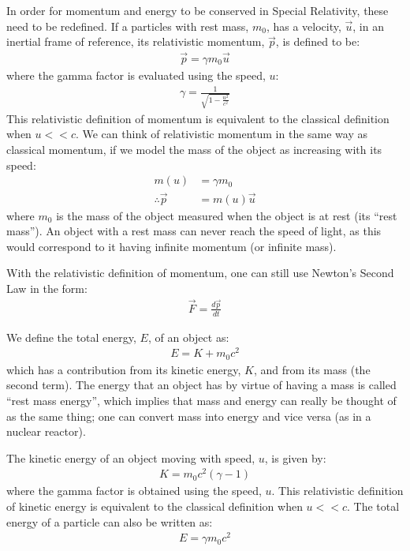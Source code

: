 \begin{chapterSummary}
In order for momentum and energy to be conserved in Special Relativity, these need to be redefined. If a particles with rest mass, $m_0$, has a velocity, $\vec u$, in an inertial frame of reference, its relativistic momentum, $\vec p$, is defined to be:
\begin{align*}
\vec p = \gamma m_0 \vec u
\end{align*}
where the gamma factor is evaluated using the speed, $u$:
\begin{align*}
\gamma = \frac{1}{\sqrt{1-\frac{u^2}{c^2}}}
\end{align*}
This relativistic definition of momentum is equivalent to the classical definition when $u<<c$. We can think of relativistic momentum in the same way as classical momentum, if we model the mass of the object as increasing with its speed:
\begin{align*}
m(u)&=\gamma m_0\\
\therefore \vec p &= m(u) \vec u
\end{align*}
where $m_0$ is the mass of the object measured when the object is at rest (its ``rest mass''). An object with a rest mass can never reach the speed of light, as this would correspond to it having infinite momentum (or infinite mass). 

With the relativistic definition of momentum, one can still use Newton's Second Law in the form:
\begin{align*}
\vec F = \frac{d\vec p}{dt}
\end{align*}

We define the total energy, $E$, of an object as:
\begin{align*}
E = K + m_0c^2
\end{align*}
which  has a contribution from its kinetic energy, $K$, and from its mass (the second term).  The energy that an object has by virtue of having a mass is called ``rest mass energy'', which implies that mass and energy can really be thought of as the same thing; one can convert mass into energy and vice versa (as in a nuclear reactor). 

The kinetic energy of an object moving with speed, $u$, is given by:
\begin{align*}
K = m_0c^2 (\gamma -1)
\end{align*}
where the gamma factor is obtained using the speed, $u$. This relativistic definition of kinetic energy is equivalent to the classical definition when $u<<c$. The total energy of a particle can also be written as:
\begin{align*}
E=\gamma m_0 c^2
\end{align*}


\end{chapterSummary}
